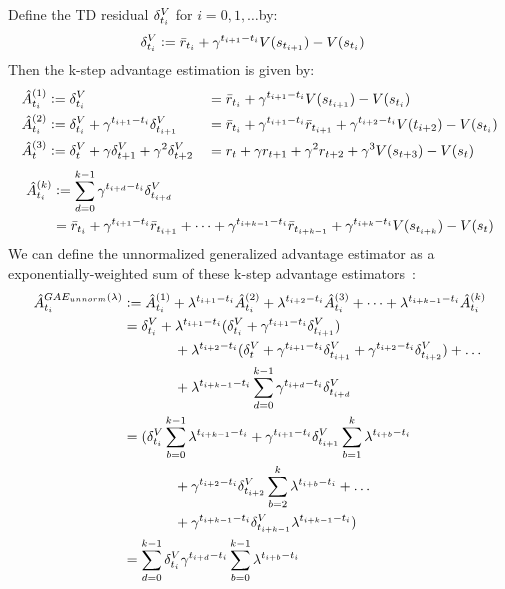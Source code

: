 Define the TD residual $\delta^V_{t_i}$ for $i=0,1, \dots$by:
\begin{align}
\delta^V_{t_i} & \vcentcolon=   \bar{r}_{t_i} + \gamma^{t_{i+1}-t_i} V(s_{t_{i+1}}) -V(s_{t_i})
\end{align}
Then the k-step advantage estimation is given by:
\begin{alignat}{2}
\hat{A}_{t_i}^{(1)} 
& \vcentcolon=   \delta^V_{{t_i}} 
 &&= \bar{r}_{t_i} + \gamma^{t_{i+1}-t_i} V(s_{t_{i+1}})-V(s_{t_i}) \\
\hat{A}_{t_i}^{(2)} 
&\vcentcolon= \delta^V_{t_i} + \gamma^{t_{i+1}-t_i} \delta^V_{t_{i+1}} 
&&= \bar{r}_{t_i} + \gamma^{t_{i+1}-t_i} \bar{r}_{t_{i+1}} + \gamma^{t_{i+2}-t_i} V(t_{i+2})-V(s_{t_i})  \\
\hat{A}_t^{(3)} 
&\vcentcolon= \delta^V_{t} + \gamma \delta^V_{t+1} + \gamma^2 \delta^V_{t+2} 
&&=  r_t + \gamma r_{t+1} + \gamma^2 r_{t+2} + \gamma^3 V(s_{t+3}) -V(s_t)  \label{a3}
\end{alignat}
\begin{align}
\begin{split}
\hat{A}_{t_i}^{(k)} 
&\vcentcolon= \sum_{d=0}^{k-1} 
\gamma^{t_{i+d}-t_i} \delta^V_{t_{i+d}} \\
&= \bar{r}_{t_i} + \gamma^{t_{i+1}-t_i} \bar{r}_{t_{i+1}} 
+ \dots 
+ \gamma^{t_{i+k-1}-t_i} \bar{r}_{t_{i+k-1}} 
+ \gamma^{t_{i+k}-t_i} V(s_{t_{i+k}})-V(s_t) 
\end{split}
\end{align}
We can define the unnormalized generalized advantage estimator as a exponentially-weighted sum of these k-step advantage estimators~\cite{schulman2015high}:
\begin{align}
\hat{A}_{t_i}^{GAE_{unnorm}(\lambda)}
&\vcentcolon=  \hat{A}_{t_i}^{(1)} + \lambda^{t_{i+1}-t_i}  \hat{A}_{t_i}^{(2)} + \lambda^{t_{i+2}-t_i} \hat{A}_{t_i}^{(3)} + \dots + \lambda^{t_{i+k-1}-t_i} \hat{A}_{t_i}^{(k)} \nonumber \\
&=  \delta^V_{t_i} 
+ \lambda^{t_{i+1}-t_i} (\delta^V_{t_i} + \gamma^{t_{i+1}-t_i} \delta^V_{t_{i+1}} ) \\
&\ \ \ \ \  \ \ \ \ \ \ +\lambda^{t_{i+2}-t_i} (\delta^V_t + \gamma^{t_{i+1}-t_i} \delta^V_{t_{i+1}} + \gamma^{t_{i+2}-t_i} \delta^V_{t_{i+2}}) + \dots \nonumber \\
&\ \ \ \ \  \ \ \ \ \ \ +\lambda^{t_{i+k-1}-t_i}  \sum_{d=0}^{k-1} \gamma^{t_{i+d}-t_i} \delta^V_{t_{i+d}}\\
&= (
\delta^V_{t_i}  \sum_{b=0}^{k-1} \lambda^{t_{i+k-1}-t_i}
+\gamma^{t_{i+1}-t_i} \delta^V_{t_{i+1}} \sum_{b=1}^k \lambda^{t_{i+b}-t_i} \nonumber \\
&\ \ \ \ \  \ \ \ \ \ \ +\gamma^{t_{i+2}-t_i} \delta^V_{t_{i+2}} \sum_{b=2}^k \lambda^{t_{i+b}-t_i}
+\dots \\
&\ \ \ \ \  \ \ \ \ \ \ +\gamma^{t_{i+k-1}-t_i} \delta^V_{t_{i+k-1}} \lambda^{t_{i+k-1}-t_i})
\nonumber \\
&= \sum_{d=0}^{k-1} \delta^V_{t_i} \gamma^{t_{i+d}-t_i} \sum_{b=0}^{k-1} \lambda^{t_{i+b}-t_i}
\label{eq:gaelam1}
\end{align}

